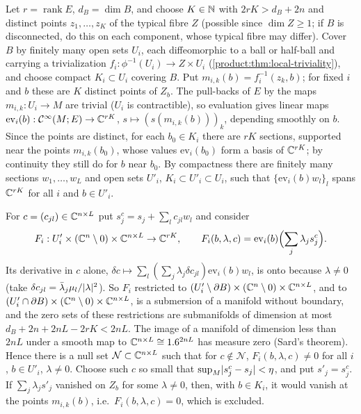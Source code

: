 Let $r=\operatorname{rank}E$, $d_B=\dim B$, and choose $K\in\mathbb{N}$ with
$2rK>d_B+2n$ and distinct points $z_1,\dots,z_K$ of the typical fibre $Z$ (possible
since $\dim Z\ge1$; if $B$ is disconnected, do this on each component, whose
typical fibre may differ). Cover $B$ by finitely many open sets $U_i$, each
diffeomorphic to a ball or half-ball and carrying a trivialization
$f_i:\phi^{-1}(U_i)\to Z\times U_i$ (\cref{product:thm:local-triviality}), and choose
compact $K_i\subset U_i$ covering $B$. Put $m_{i,k}(b)=f_i^{-1}(z_k,b)$; for
fixed $i$ and $b$ these are $K$ distinct points of $Z_b$. The pull-backs of $E$ by
the maps $m_{i,k}:U_i\to M$ are trivial ($U_i$ is contractible), so evaluation
gives linear maps $\mathrm{ev}_i(b):\mathcal{C}^\infty(M;E)\to\mathbb{C}^{rK}$, $s\mapsto(s(m_{i,k}(b)))_k$,
depending smoothly on $b$. Since the points are distinct, for each $b_0\in K_i$
there are $rK$ sections, supported near the points $m_{i,k}(b_0)$, whose values
$\mathrm{ev}_i(b_0)$ form a basis of $\mathbb{C}^{rK}$; by continuity they still do for $b$
near $b_0$. By compactness there are finitely many sections $w_1,\dots,w_L$ and
open sets $U'_i$, $K_i\subset U'_i\subset U_i$, such that
$\{\mathrm{ev}_i(b)w_l\}_l$ spans $\mathbb{C}^{rK}$ for all $i$ and $b\in U'_i$.

For $c=(c_{jl})\in\mathbb{C}^{n\times L}$ put $s_j^c=s_j+\sum_lc_{jl}w_l$ and consider
\begin{equation*}
  F_i:U'_i\times(\mathbb{C}^n\setminus0)\times\mathbb{C}^{n\times L}\to\mathbb{C}^{rK},\qquad
  F_i(b,\lambda,c)=\mathrm{ev}_i(b)\Bigl(\sum_j\lambda_js^c_j\Bigr).
\end{equation*}
Its derivative in $c$ alone, $\delta c\mapsto\sum_l(\sum_j\lambda_j\delta c_{jl})
\mathrm{ev}_i(b)w_l$, is onto because $\lambda\ne0$ (take $\delta c_{jl}=
\bar\lambda_j\mu_l/\lvert \lambda\rvert^2$). So $F_i$ restricted to
$(U'_i\setminus\partial B)\times(\mathbb{C}^n\setminus0)\times\mathbb{C}^{n\times L}$, and to
$(U'_i\cap\partial B)\times(\mathbb{C}^n\setminus0)\times\mathbb{C}^{n\times L}$, is a submersion of a
manifold without boundary, and the zero sets of these restrictions are submanifolds
of dimension at most $d_B+2n+2nL-2rK<2nL$. The image of a manifold of dimension
less than $2nL$ under a smooth map to $\mathbb{C}^{n\times L}\cong1.6^{2nL}$ has measure zero
(Sard's theorem). Hence there is a null set $\mathcal N\subset\mathbb{C}^{n\times L}$ such
that for $c\notin\mathcal N$, $F_i(b,\lambda,c)\ne0$ for all $i$, $b\in U'_i$,
$\lambda\ne0$. Choose such $c$ so small that $\sup_M\lvert s^c_j-s_j\rvert<\eta$, and put
$s'_j=s_j^c$. If $\sum_j\lambda_js'_j$ vanished on $Z_b$ for some $\lambda\ne0$,
then, with $b\in K_i$, it would vanish at the points $m_{i,k}(b)$, i.e.\
$F_i(b,\lambda,c)=0$, which is excluded.

